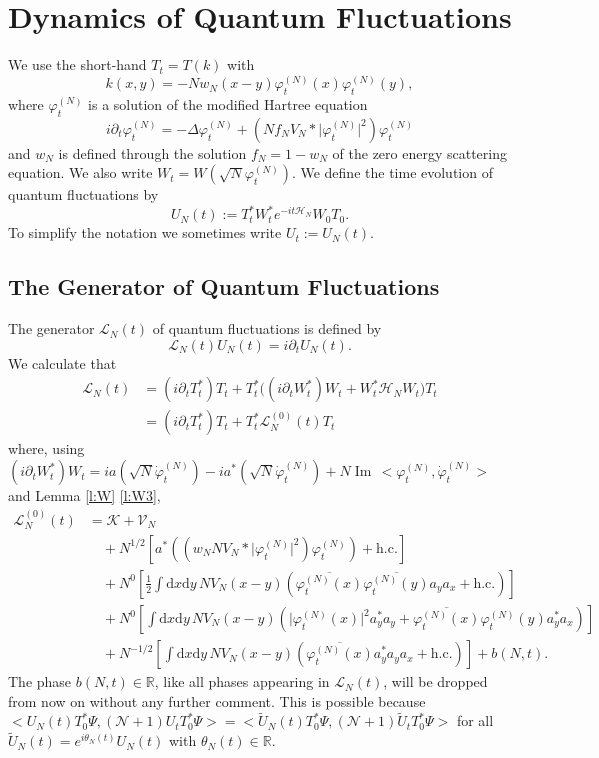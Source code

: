 \documentclass[11pt,a4paper,DIV11]{scrartcl}	%
\newcommand{\di}{\textrm{d}}		%
\newcommand{\Lcal}{\mathcal{L}}		%
\newcommand{\Ncal}{\mathcal{N}}		%
\newcommand{\Kcal}{\mathcal{K}}		%
\newcommand{\Vcal}{\mathcal{V}}		%
\newcommand{\Hcal}{\mathcal{H}}		%
\newcommand{\hc}{\mbox{h.c.}}		%
\newcommand{\scal}[2]{\big<#1,#2\big>} %
\newcommand{\cc}[1]{\overline{#1}}	%
\newcommand{\Rbb}{\mathbb{R}}		%
\renewcommand{\Im}{\operatorname{Im}\,} 	%
\newcommand{\ph}{\varphi_t^{(N)}}	%
\newcommand{\phdot}{\dot{\varphi}_t^{(N)}}	%
\newcommand{\be}[1]{\begin{equation}\label{eq:#1}}	%
\newcommand{\ee}{\end{equation}}
\newcommand{\bd}{\begin{displaymath}}			%
\newcommand{\ed}{\end{displaymath}}
\begin{document}
\section{Dynamics of Quantum Fluctuations}
\label{s:fluctuations}
We use the short-hand $T_t = T(k)$ with
\bd
k(x,y) = - N w_N(x-y) \ph(x) \ph(y),
\ed
where $\ph$ is a solution of the modified Hartree equation
\[
 i \partial_t \ph = -\Delta \ph + \left(N f_N V_N \ast \lvert \ph\rvert^2 \right) \ph
\]
and $w_N$ is defined through the solution $f_N = 1 - w_N$ of the zero energy scattering equation.
We also write $W_t = W(\sqrt{N}\ph)$.
We define the time evolution of quantum fluctuations by
\bd
U_N(t) := T^\ast_t W^\ast_t e^{-it \Hcal_N} W_0 T_0.
\ed
To simplify the notation we sometimes write $U_t := U_N(t)$.

\subsection{The Generator of Quantum Fluctuations}
\label{ss:generator}
The generator $\Lcal_N(t)$ of quantum fluctuations is defined by
\bd
\Lcal_N(t) U_N(t) = i \partial_t U_N(t).
\ed
We calculate that
\begin{align*}
\Lcal_N(t) 	& = (i \partial_t T^*_t) T_t + T^*_t \big( (i \partial_t W^*_t) W_t + W^*_t \Hcal_N W_t \big) T_t \\
		& = (i \partial_t T^*_t) T_t + T^*_t \Lcal^{(0)}_N(t) T_t
\end{align*}
where, using $(i \partial_t W^*_t) W_t = i a(\sqrt{N} \phdot) - i a^\ast(\sqrt{N}\phdot) + N \Im \scal{\ph}{\phdot}$ and Lemma \ref{l:W} \ref{l:W3},
\be{no3}
\begin{split}
\Lcal^{(0)}_N(t) & = \Kcal + \Vcal_N \\
		& \quad + N^{1/2} \left[  a^*\left( (w_N N V_N \ast \lvert \ph \rvert^2)\ph \right) + \hc  \right] \\
		& \quad + N^0	    \left[  \frac{1}{2}\int \di x \di y\, NV_N(x-y)\left( \cc{\ph(x)} \cc{\ph(y)} a_y a_x + \hc \right) \right] \\
		& \quad + N^0	    \left[  \int \di x \di y\, NV_N(x-y)\left( \lvert \ph(x) \rvert^2 a^*_y a_y + \cc{\ph(x)} \ph(y) a^*_y a_x \right) \right] \\
		& \quad + N^{-1/2}\left[  \int \di x \di y\, NV_N(x-y) \left( \cc{\ph(x)} a^*_y a_y a_x + \hc \right)  \right] + b(N,t).
\end{split}
\ee
The phase $b(N,t) \in \Rbb$, like all phases appearing in $\Lcal_N(t)$, will
be dropped from now on without any further comment. This is possible because $\scal{U_N(t)T^\ast_0 \Psi}{(\Ncal+1)U_t T_0^\ast \Psi} = \scal{\tilde U_N(t)T^\ast_0 \Psi}{(\Ncal+1)\tilde U_t T_0^\ast \Psi}$ for all $\tilde U_N(t) = e^{i\theta_N(t)} U_N(t)$ with $\theta_N(t) \in \Rbb$.
\end{document}
